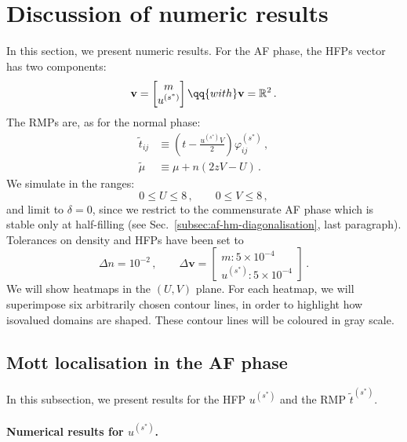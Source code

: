 \section{Discussion of numeric results}\label{sec:af-numeric}

In this section, we present numeric results. For the AF phase, the HFPs vector has two components:
\[
\mathbf{v} = \begin{bmatrix}
	m \\ u^{(s^*)}
\end{bmatrix}
\qq{with}
\mathbf{v} = \mathbb{R}^2 \, .
\]
The RMPs are, as for the normal phase:
\[
\begin{aligned}
	\tilde{t}_{ij} &\equiv \left(
	t - \frac{u^{(s^*)}V}{2}
	\right) \varphi_{ij}^{(s^*)} \, , \\
	\tilde{\mu} &\equiv \mu + n (2zV-U) \, .
\end{aligned}
\]
We simulate in the ranges:
\[
0 \le U \le 8 \, ,
\qquad
0 \le V \le 8 \, ,
\]
and limit to $\delta=0$, since we restrict to the commensurate AF phase which is stable only at half-filling (see Sec.~\ref{subsec:af-hm-diagonalisation}, last paragraph). Tolerances on density and HFPs have been set to
\[
\Delta n = 10^{-2} \, ,
\qquad
\Delta \mathbf{v} = \begin{bmatrix}
	m \colon 5 \times 10^{-4} \\
	u^{(s^*)} \colon 5 \times 10^{-4}
\end{bmatrix} \, .
\]
We will show heatmaps in the $(U,V)$ plane. For each heatmap, we will superimpose six arbitrarily chosen contour lines, in order to highlight how isovalued domains are shaped. These contour lines will be coloured in gray scale.

\subsection{Mott localisation in the AF phase}

In this subsection, we present results for the HFP $u^{(s^*)}$ and the RMP $\tilde{t}^{(s^*)}$.

\paragraph{Numerical results for $u^{(s^*)}$.}

